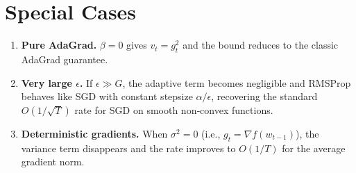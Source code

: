 \documentclass{article}
\begin{document}
\section*{Special Cases}
\begin{enumerate}
\item \textbf{Pure AdaGrad.} $\beta=0$ gives $v_{t}=g_{t}^{2}$ and the bound reduces to the classic AdaGrad guarantee.
\item \textbf{Very large $\epsilon$.} If $\epsilon\gg G$, the adaptive term becomes negligible and RMSProp behaves like SGD with constant stepsize $\alpha/\epsilon$, recovering the standard $O(1/\sqrt{T})$ rate for SGD on smooth non‑convex functions.
\item \textbf{Deterministic gradients.} When $\sigma^{2}=0$ (i.e., $g_{t}=\nabla f(w_{t-1})$), the variance term disappears and the rate improves to $O(1/T)$ for the average gradient norm.
\end{enumerate}
\end{document}
